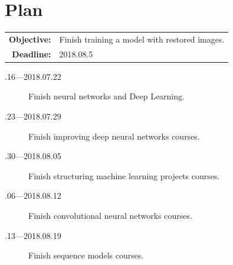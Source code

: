 \documentclass[a4paper]{article}
\begin{document}
\section{Plan}

\begin{tabular}{rl}
	\textbf{Objective:} & Finish training a model with restored images. \\
	\textbf{Deadline:} & 2018.08.5
\end{tabular}

\begin{description}
	\item[.16---2018.07.22] Finish neural networks and Deep Learning.
	\item[.23---2018.07.29] Finish improving deep neural networks courses.
	\item[.30---2018.08.05] Finish structuring machine learning projects courses.
	\item[.06---2018.08.12] Finish convolutional neural networks courses.
	\item[.13---2018.08.19] Finish sequence models courses.
\end{description}





\end{document}

